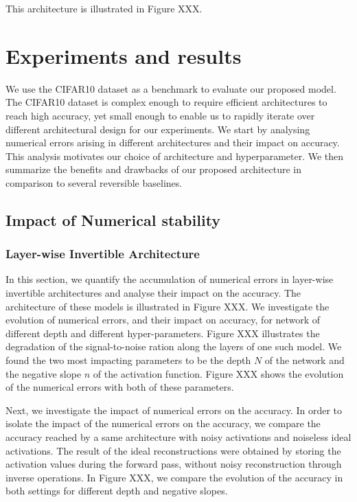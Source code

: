 \documentclass[twocolumn]{bmcart}
\begin{document}
This architecture is illustrated in Figure XXX.

\section{Experiments and results}

We use the CIFAR10 dataset as a benchmark to evaluate our proposed model.
The CIFAR10 dataset is complex enough to require efficient architectures to reach high accuracy, 
yet small enough to enable us to rapidly iterate over different architectural design for our experiments.
We start by analysing numerical errors arising in different architectures and their impact on accuracy.
This analysis motivates our choice of architecture and hyperparameter.
We then summarize the benefits and drawbacks of our proposed architecture in comparison to several reversible baselines.

\subsection{Impact of Numerical stability}

\subsubsection{Layer-wise Invertible Architecture}

In this section, we quantify the accumulation of numerical errors in layer-wise invertible architectures and analyse their impact on the accuracy.
The architecture of these models is illustrated in Figure XXX.
We investigate the evolution of numerical errors, and their impact on accuracy, for network of different depth and different hyper-parameters. 
Figure XXX illustrates the degradation of the signal-to-noise ration along the layers of one such model. 
We found the two most impacting parameters to be the depth $N$ of the network and the negative slope $n$ of the activation function.
Figure XXX shows the evolution of the numerical errors with both of these parameters.

Next, we investigate the impact of numerical errors on the accuracy.
In order to isolate the impact of the numerical errors on the accuracy, 
we compare the accuracy reached by a same architecture with noisy activations and noiseless ideal activations.
The result of the ideal reconstructions were obtained by storing the activation values during the forward pass, 
without noisy reconstruction through inverse operations. 
In Figure XXX, we compare the evolution of the accuracy in both settings for different depth and negative slopes.
\end{document}
